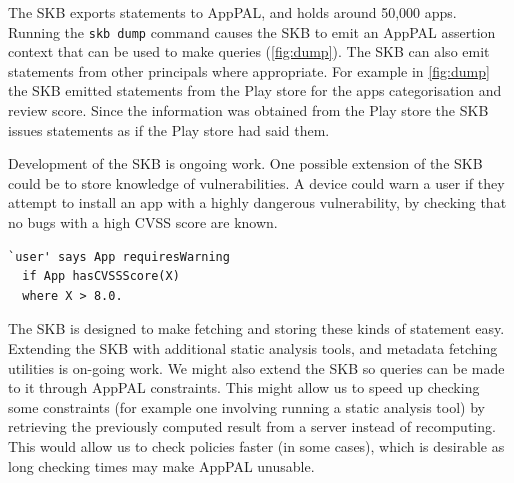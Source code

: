 \documentclass[a4paper]{scrartcl}
\begin{document}
The \ac{SKB} exports statements to AppPAL, and holds around 50,000 apps.
Running the \texttt{skb dump} command causes the SKB to emit an AppPAL assertion context that can be used to make queries (\autoref{fig:dump}).
The \ac{SKB} can also emit statements from other principals where appropriate.
For example in \autoref{fig:dump} the \ac{SKB} emitted  statements from the Play store for the apps categorisation and review score.
Since the information was obtained from the Play store the \ac{SKB} issues statements as if the Play store had said them.

Development of the \ac{SKB} is ongoing work.
One possible extension of the \ac{SKB} could be to store knowledge of vulnerabilities.
A device could warn a user if they attempt to install an app with a highly dangerous vulnerability, by checking that no bugs with a high CVSS score are known.
\begin{lstlisting}
`user' says App requiresWarning
  if App hasCVSSScore(X)
  where X > 8.0.
\end{lstlisting}
The \ac{SKB} is designed to make fetching and storing these kinds of statement easy.
Extending the \ac{SKB} with additional static analysis tools, and metadata fetching utilities is on-going work.
We might also extend the \ac{SKB} so queries can be made to it through AppPAL constraints.
This might allow us to speed up checking some constraints (for example one involving running a static analysis tool) by retrieving the previously computed result from a server instead of recomputing.
This would allow us to check policies faster (in some cases), which is desirable as long checking times may make AppPAL unusable.
\end{document}
